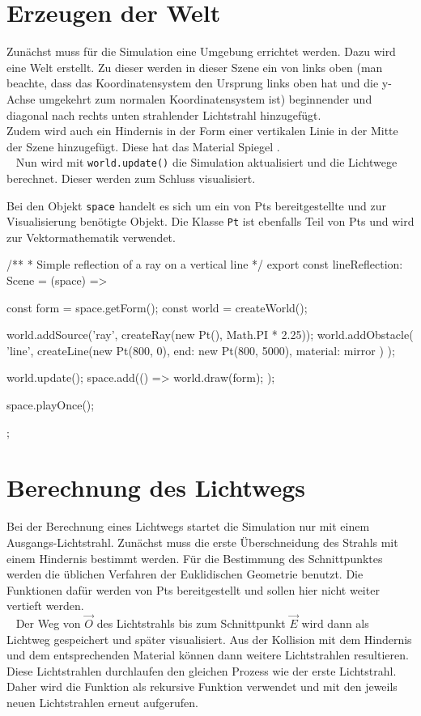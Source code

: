 \section{Erzeugen der Welt}
Zunächst muss für die Simulation eine Umgebung errichtet werden. Dazu wird eine Welt erstellt.
Zu dieser werden in dieser Szene ein von links oben (man beachte, dass das Koordinatensystem den 
Ursprung links oben hat und die y-Achse umgekehrt zum normalen Koordinatensystem ist) beginnender und diagonal nach rechts 
unten strahlender Lichtstrahl hinzugefügt. \\
Zudem wird auch ein Hindernis in der Form einer vertikalen Linie in der Mitte der Szene hinzugefügt. 
Diese hat das Material Spiegel . \\ 
Nun wird mit \texttt{world.update()} die Simulation aktualisiert und die Lichtwege berechnet. Dieser werden zum Schluss visualisiert.

Bei den Objekt \texttt{space} handelt es sich um ein von Pts bereitgestellte und zur Visualisierung benötigte Objekt. 
Die Klasse \texttt{Pt} ist ebenfalls Teil von Pts und wird zur Vektormathematik verwendet.
\newpage

\begin{verbnobox}[\scriptsize\mbox{}]
/**
 * Simple reflection of a ray on a vertical line
 */
export const lineReflection: Scene = (space) => {
    const form = space.getForm();
    const world = createWorld();

    world.addSource('ray', createRay(new Pt(), Math.PI * 2.25));
    world.addObstacle(
        'line',
        createLine(new Pt(800, 0), { end: new Pt(800, 5000), material: mirror })
    );

    world.update();
    space.add(() => {
        world.draw(form);
    });

    space.playOnce();
};
\end{verbnobox}

\section{Berechnung des Lichtwegs}
Bei der Berechnung eines Lichtwegs startet die Simulation nur mit einem Ausgangs-Lichtstrahl.
Zunächst muss die erste Überschneidung des Strahls mit einem Hindernis bestimmt werden. 
Für die Bestimmung des Schnittpunktes werden die üblichen Verfahren der Euklidischen Geometrie benutzt. 
Die Funktionen dafür werden von Pts bereitgestellt und sollen hier nicht weiter vertieft werden. \\ 
Der Weg von $ \vec{O} $ des Lichtstrahls bis zum Schnittpunkt $ \vec{E} $ wird dann als Lichtweg gespeichert und später visualisiert.
Aus der Kollision mit dem Hindernis und dem entsprechenden Material können dann weitere Lichtstrahlen resultieren. 
Diese Lichtstrahlen durchlaufen den gleichen Prozess wie der erste Lichtstrahl. 
Daher wird die Funktion als rekursive Funktion verwendet und mit den jeweils neuen Lichtstrahlen erneut aufgerufen.


